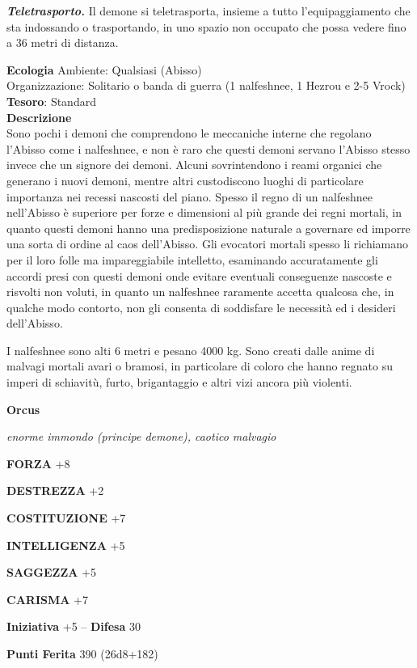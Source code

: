 \begin{multicols}{2}
	\textit{\textbf{Teletrasporto.}} Il demone si teletrasporta, insieme a tutto l'equipaggiamento che sta indossando o trasportando, in uno spazio non occupato che possa vedere fino a 36 metri di distanza.

	\textbf{Ecologia}
	Ambiente: Qualsiasi (Abisso)\\
	Organizzazione: Solitario o banda di guerra (1 nalfeshnee, 1 Hezrou e 2-5 Vrock)\\
	\textbf{Tesoro}: Standard\\
	\textbf{Descrizione}\\
	Sono pochi i demoni che comprendono le meccaniche interne che regolano l'Abisso come i nalfeshnee, e non è raro che questi demoni servano l'Abisso stesso invece che un signore dei demoni. Alcuni sovrintendono i reami organici che generano i nuovi demoni, mentre altri custodiscono luoghi di particolare importanza nei recessi nascosti del piano. Spesso il regno di un nalfeshnee nell'Abisso è superiore per forze e dimensioni al più grande dei regni mortali, in quanto questi demoni hanno una predisposizione naturale a governare ed imporre una sorta di ordine al caos dell'Abisso. Gli evocatori mortali spesso li richiamano per il loro folle ma impareggiabile intelletto, esaminando accuratamente gli accordi presi con questi demoni onde evitare eventuali conseguenze nascoste e risvolti non voluti, in quanto un nalfeshnee raramente accetta qualcosa che, in qualche modo contorto, non gli consenta di soddisfare le necessità ed i desideri dell'Abisso.

	I nalfeshnee sono alti 6 metri e pesano 4000 kg. Sono creati dalle anime di malvagi mortali avari o bramosi, in particolare di coloro che hanno regnato su imperi di schiavitù, furto, brigantaggio e altri vizi ancora più violenti.

	\medskip{}\textbf{Orcus}

	\textit{enorme immondo (principe demone), caotico malvagio}

	\textbf{FORZA} +8

	\textbf{DESTREZZA} +2

	\textbf{COSTITUZIONE} +7

	\textbf{INTELLIGENZA} +5

	\textbf{SAGGEZZA} +5

	\textbf{CARISMA} +7

	\textbf{Iniziativa} +5 -- \textbf{Difesa} 30

	\textbf{Punti Ferita} 390 (26d8+182)


\end{multicols}
